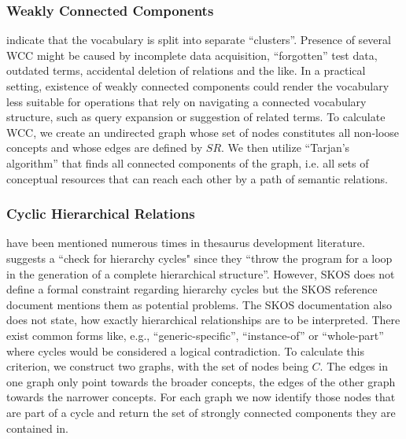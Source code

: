 \subsubsection{Weakly Connected Components} indicate that the vocabulary is split into separate ``clusters''. Presence of several WCC might be caused by incomplete data acquisition, ``forgotten'' test data, outdated terms, accidental deletion of relations and the like. In a practical setting, existence of weakly connected components could render the vocabulary less suitable for operations that rely on navigating a connected vocabulary structure, such as query expansion or suggestion of related terms. To calculate WCC, we create an undirected graph whose set of nodes constitutes all non-loose concepts and whose edges are defined by $SR$. We then utilize ``Tarjan’s algorithm''\cite{Hopcroft1973} that finds all connected components of the graph, i.e. all sets of conceptual resources that can reach each other by a path of semantic relations.

 

\subsubsection{Cyclic Hierarchical Relations} have been mentioned numerous times in thesaurus development literature. \cite{Soergel2002} suggests a ``check for hierarchy cycles" since they ``throw the program for a loop in the generation of a complete hierarchical structure''. However, SKOS does not define a formal constraint regarding hierarchy cycles but the SKOS reference document mentions them as potential problems. The SKOS documentation also does not state, how exactly hierarchical relationships are to be interpreted. There exist common forms like, e.g., ``generic-specific'', ``instance-of'' or ``whole-part'' \cite{Hedden2010,Harpring2010,Aitchison2000} where cycles would be considered a logical contradiction. To calculate this criterion, we construct two graphs, with the set of nodes being $C$. The edges in one graph only point towards the broader concepts, the edges of the other graph towards the narrower concepts. For each graph we now identify those nodes that are part of a cycle and return the set of strongly connected components they are contained in.

